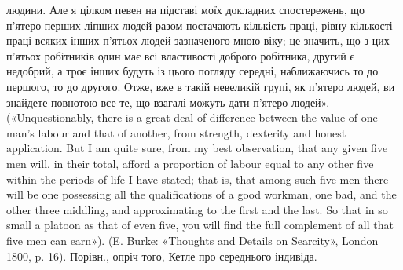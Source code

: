 людини. Але я цілком певен на підставі моїх докладних спостережень, що
п’ятеро перших-ліпших людей разом постачають кількість праці, рівну
кількості праці всяких інших п'ятьох людей зазначеного мною віку; це
значить, що з цих п’ятьох робітників один має всі властивості доброго
робітника, другий є недобрий, а троє інших будуть із цього погляду середні, наближаючись то до
першого, то до другого. Отже, вже в такій
невеликій групі, як п’ятеро людей, ви знайдете повнотою все те, що взагалі
можуть дати п'ятеро людей». («Unquestionably, there is a great deal
of difference between the value of one man’s labour and that of another,
from strength, dexterity and honest application. But I am quite sure, from
my best observation, that any given five men will, in their total, afford a
proportion of labour equal to any other five within the periods of life I have
stated; that is, that among such five men there will be one possessing all
the qualifications of a good workman, one bad, and the other three middling,
and approximating to the first and the last. So that in so small a platoon
as that of even five, you will find the full complement of all that five men
can earn»). (E. Burke: «Thoughts and Details on Searcity», London
1800, p. 16). Порівн., опріч того, Кетле про середнього індивіда.
